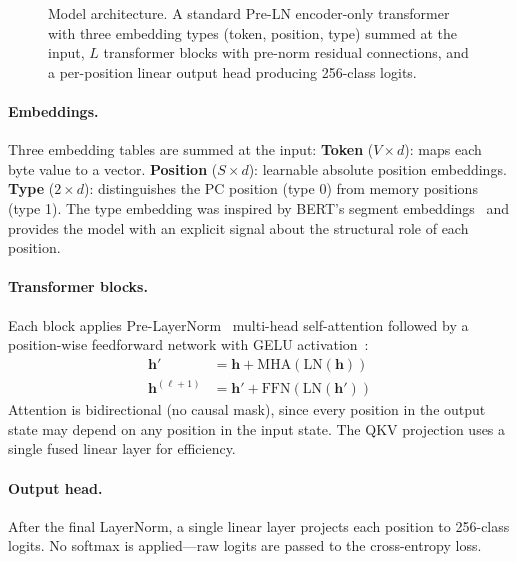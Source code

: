 \documentclass[11pt,a4paper]{article}
\begin{document}
\begin{figure}[h]
\caption{Model architecture. A standard Pre-LN encoder-only transformer with three embedding types (token, position, type) summed at the input, $L$ transformer blocks with pre-norm residual connections, and a per-position linear output head producing 256-class logits.}
\label{fig:architecture}
\end{figure}

\paragraph{Embeddings.}
Three embedding tables are summed at the input:
\textbf{Token} ($V \times d$): maps each byte value to a vector.
\textbf{Position} ($S \times d$): learnable absolute position embeddings.
\textbf{Type} ($2 \times d$): distinguishes the PC position (type 0) from memory positions (type 1).
The type embedding was inspired by BERT's segment embeddings~\cite{devlin2019bert} and provides the model with an explicit signal about the structural role of each position.

\paragraph{Transformer blocks.}
Each block applies Pre-LayerNorm~\cite{xiong2020layer} multi-head self-attention followed by a position-wise feedforward network with GELU activation~\cite{hendrycks2016gelu}:
\begin{align}
  \mathbf{h}' &= \mathbf{h} + \mathrm{MHA}(\mathrm{LN}(\mathbf{h})) \\
  \mathbf{h}^{(\ell+1)} &= \mathbf{h}' + \mathrm{FFN}(\mathrm{LN}(\mathbf{h}'))
\end{align}
Attention is bidirectional (no causal mask), since every position in the output state may depend on any position in the input state.
The QKV projection uses a single fused linear layer for efficiency.

\paragraph{Output head.}
After the final LayerNorm, a single linear layer projects each position to 256-class logits.
No softmax is applied---raw logits are passed to the cross-entropy loss.
\end{document}
